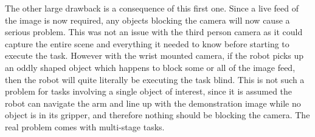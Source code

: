 The other large drawback is a consequence of this first one. Since a live feed of the image is now required, any objects blocking the camera will now cause a serious problem. This was not an issue with the third person camera as it could capture the entire scene and everything it needed to know before starting to execute the task. However with the wrist mounted camera, if the robot picks up an oddly shaped object which happens to block some or all of the image feed, then the robot will quite literally be executing the task blind. This is not such a problem for tasks involving a single object of interest, since it is assumed the robot can navigate the arm and line up with the demonstration image while no object is in its gripper, and therefore nothing should be blocking the camera. The real problem comes with multi-stage tasks.\\
